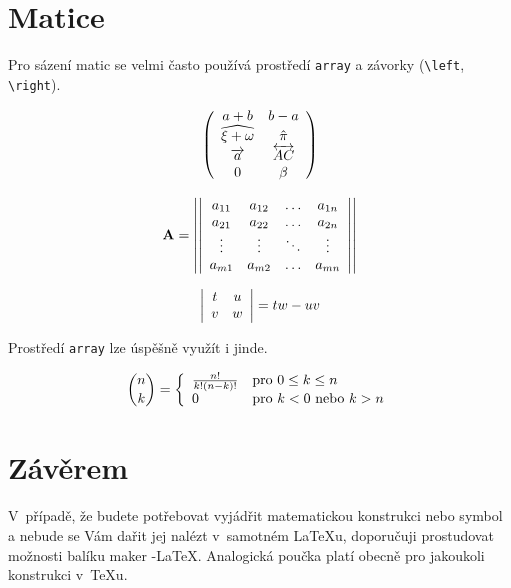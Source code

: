 \documentclass[11pt,a4paper,twocolumn]{article}
\begin{document}
\section{Matice}

Pro sázení matic se velmi často používá prostředí \texttt{array} a závorky (\verb|\left|, \verb|\right|). 

$$\left(\begin{array}{c c}
a+b & b-a \\
\widehat{\xi+\omega} & \hat{\pi}\\
\overrightarrow{a} & \overleftrightarrow{AC}\\
0 & \beta
\end{array}\right)$$

$$\mathbf{A}=\left|\left|\begin{array}{c c c c}
a_{11}&a_{12}&\ldots&a_{1n}\\
a_{21}&a_{22}&\ldots&a_{2n}\\
\vdots&\vdots&\ddots&\vdots\\
a_{m1}&a_{m2}&\ldots&a_{mn}
\end{array}\right|\right|$$

$$\left|\begin{array}{c c}
t&u\\
v&w
\end{array}\right|=tw-uv$$

Prostředí \texttt{array} lze úspěšně využít i jinde.

$$\binom{n}{k}=\left\{\begin{array}{l l}\frac{n!}{k!(n-k)!}&\text{pro }0\leq k\leq n\\0&\text{pro }k<0\text{ nebo }k>n\end{array}\right.$$

\section{Závěrem}

V~případě, že budete potřebovat vyjádřit matematickou konstrukci nebo symbol a nebude se Vám dařit jej nalézt v~samotném \LaTeX u, doporučuji prostudovat možnosti balíku maker \AmS -\LaTeX.
Analogická poučka platí obecně pro jakoukoli konstrukci v~\TeX u.
\end{document}
